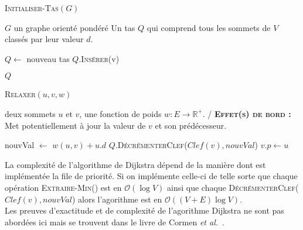 
\begin{algorithm}
	\caption{\textsc {Initialiser-Tas}$(G)$}
	 \label{algo:initTas}
	\begin{algorithmic}[1]
		\REQUIRE $G$ un graphe orienté pondéré
		\ENSURE Un tas $Q$ qui comprend tous les sommets de $V$ classés par leur valeur $d$.
		
		\STATE $Q \leftarrow$ nouveau tas 
			\STATE $Q.$\textsc{Insérer}(v)
		\ENDFOR
		
		\RETURN $Q$
	
			
\end{algorithmic}
		
\end{algorithm}


\begin{algorithm}
	\caption{\textsc {Relaxer}$(u,v,w)$}
	 \label{algo:relaxer}
	\begin{algorithmic}[1]
		\REQUIRE deux sommets $u$ et $v$, une fonction de poids $w : E \rightarrow \mathbb{R}^{+}$.
		\ENSURE / \textbf{\textsc{Effet(s) de bord :}} Met potentiellement à jour la  valeur de $v$ et son prédécesseur.
		
		\STATE nouvVal $\leftarrow$ $w(u,v) + u.d$
			\STATE $Q.$\textsc{DécrémenterClef}($Clef(v),nouvVal$)
			\STATE $v.p \leftarrow u$
		\ENDIF
	
			
\end{algorithmic}
		
\end{algorithm}

La complexité de l'algorithme de Dijkstra dépend de la manière dont est implémentée la file de priorité. Si on implémente celle-ci de telle sorte que chaque opération \textsc{Extraire-Min}() est en $\mathcal{O}(\log V)$ ainsi que chaque \textsc{DécrémenterClef}($Clef(v),nouvVal$) alors l'agorithme est en \mbox{$\mathcal{O}((V + E) \log V)$}.\\
Les preuves d'exactitude et de complexité de l'agorithme Dijkstra ne sont pas abordées ici mais se trouvent dans le livre de Cormen \emph{et al.}~\cite{Cormen:2009:IA:580470}.


\clearpage

